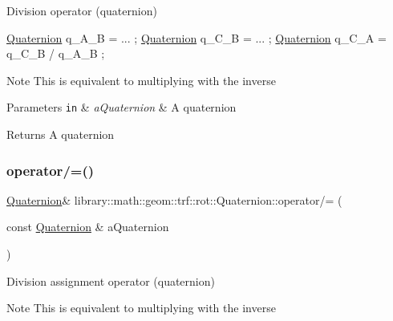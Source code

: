 Division operator (quaternion) 


\begin{DoxyCode}
\hyperlink{classlibrary_1_1math_1_1geom_1_1trf_1_1rot_1_1_quaternion_aa7f459a08f5af38b9f7676a6bf36a21c}{Quaternion} q\_A\_B = ... ;
\hyperlink{classlibrary_1_1math_1_1geom_1_1trf_1_1rot_1_1_quaternion_aa7f459a08f5af38b9f7676a6bf36a21c}{Quaternion} q\_C\_B = ... ;
\hyperlink{classlibrary_1_1math_1_1geom_1_1trf_1_1rot_1_1_quaternion_aa7f459a08f5af38b9f7676a6bf36a21c}{Quaternion} q\_C\_A = q\_C\_B / q\_A\_B ;
\end{DoxyCode}


\begin{DoxyNote}{Note}
This is equivalent to multiplying with the inverse
\end{DoxyNote}

\begin{DoxyParams}[1]{Parameters}
\mbox{\tt in}  & {\em a\+Quaternion} & A quaternion \\
\hline
\end{DoxyParams}
\begin{DoxyReturn}{Returns}
A quaternion 
\end{DoxyReturn}
\mbox{\label{classlibrary_1_1math_1_1geom_1_1trf_1_1rot_1_1_quaternion_a7fa4e603682637efaf785320025536a1}} 
\subsubsection{\texorpdfstring{operator/=()}{operator/=()}}
{\footnotesize\ttfamily \hyperlink{classlibrary_1_1math_1_1geom_1_1trf_1_1rot_1_1_quaternion}{Quaternion}\& library\+::math\+::geom\+::trf\+::rot\+::\+Quaternion\+::operator/= (\begin{DoxyParamCaption}\item[{const \hyperlink{classlibrary_1_1math_1_1geom_1_1trf_1_1rot_1_1_quaternion}{Quaternion} \&}]{a\+Quaternion }\end{DoxyParamCaption})}



Division assignment operator (quaternion) 

\begin{DoxyNote}{Note}
This is equivalent to multiplying with the inverse
\end{DoxyNote}

